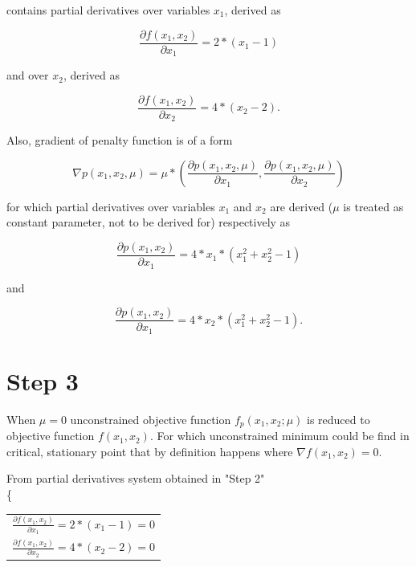 \documentclass[main.tex]{subfiles}
\begin{document}
contains partial derivatives over variables $x_1$, derived as

\begin{equation}
     \frac{\partial{f(x_1,x_2)}}{\partial{x_1}} = 2*(x_1-1)
\end{equation}

and over $x_2$, derived as

\begin{equation}
 \frac{\partial{f(x_1,x_2)}}{\partial{x_2}} = 4*(x_2-2).
\end{equation}

Also, gradient of penalty function is of a form

\begin{equation}
    \nabla{p(x_1,x_2,\mu)} = \mu*\left(
    \frac{\partial{p(x_1,x_2,\mu)}}{\partial{x_1}}, \frac{\partial{p(x_1,x_2,\mu)}}{\partial{x_2}}
    \right)  
\end{equation}

for which partial derivatives over variables $x_1$ and $x_2$ are derived ($\mu$ is treated as constant parameter, not to be derived for) respectively as 

\begin{equation}
     \frac{\partial{p(x_1,x_2)}}{\partial{x_1}} = 4 * x_1 * (x_1^2 + x_2^2 - 1)
\end{equation}

and

\begin{equation}
     \frac{\partial{p(x_1,x_2)}}{\partial{x_1}} = 4 * x_2 * (x_1^2 + x_2^2 - 1).
\end{equation}


\newpage
\section{Step 3}

\item When $\mu=0$ unconstrained objective function $f_p(x_1,x_2;\mu)$ is reduced to objective function $f(x_1,x_2)$. For which unconstrained minimum could be find in critical, stationary point that by definition happens where $\nabla{f(x_1,x_2)} = 0$. 

From partial derivatives system obtained in "Step 2"\\

\left \{
  \begin{tabular}{l}
  $\frac{\partial{f(x_1,x_2)}}{\partial{x_1}} = 2*(x_1-1) = 0$\\
  $\frac{\partial{f(x_1,x_2)}}{\partial{x_2}} = 4*(x_2-2) = 0$\\
  \end{tabular}
\right\\
\end{document}
